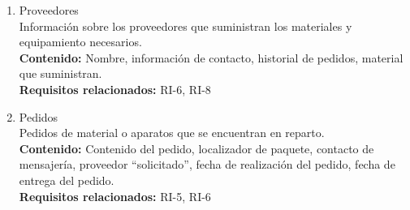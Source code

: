 \documentclass[12pt, spanish]{article}
\begin{document}
\begin{enumerate}[start =1, label={\bfseries RI-\arabic*.}]
  \item Proveedores  
  \\ Información sobre los proveedores que suministran los materiales y equipamiento necesarios.
  \\ \textbf{Contenido:} Nombre, información de contacto, historial de pedidos, material que suministran.
  \\ \textbf{Requisitos relacionados:} RI-6, RI-8
  \item Pedidos  
  \\ Pedidos de material o aparatos que se encuentran en reparto. 
  \\ \textbf{Contenido:} Contenido del pedido, localizador de paquete, contacto de mensajería, proveedor “solicitado”, fecha de realización del pedido, fecha de entrega del pedido.
  \\ \textbf{Requisitos relacionados:} RI-5, RI-6
\end{enumerate}


\vspace{5cm}



\end{document}
